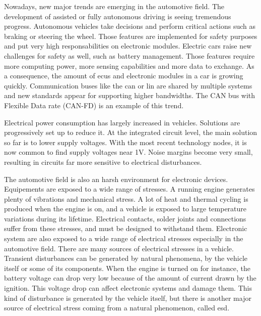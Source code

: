 Nowadays, new major trends are emerging in the automotive field.
The development of assisted or fully autonomous driving is seeing tremendous progress.
Autonomous vehicles take decisions and perform critical actions such as braking or steering the wheel.
Those features are implemented for safety purposes and put very high responsabilities on electronic modules.
Electric cars raise new challenges for safety as well, such as battery management.
Those features require more computing power, more sensing capabilities and more data to exchange.
As a consequence, the amount of \gls{ecu}s and electronic modules in a car is growing quickly.
Communication buses like the \gls{can} \cite{CAN} or \gls{lin} \cite{LIN} are shared by multiple systems and new standards appear for supporting higher bandwidths.
The CAN bus with Flexible Data rate (CAN-FD) is an example of this trend.

Electrical power consumption has largely increased in vehicles.
Solutions are progressively set up to reduce it.
At the integrated circuit level, the main solution so far is to lower supply voltages.
With the most recent technology nodes, it is now common to find supply voltages near 1V.
Noise margins become very small, resulting in circuits far more sensitive to electrical disturbances.

The automotive field is also an harsh environment for electronic devices.
Equipements are exposed to a wide range of stresses.
A running engine generates plenty of vibrations and mechanical stress.
A lot of heat and thermal cycling is produced when the engine is on, and a vehicle is exposed to large temperature variations during its lifetime.
Electrical contacts, solder joints and connections suffer from these stresses, and must be designed to withstand them.
Electronic system are also exposed to a wide range of electrical stresses especially in the automotive field.
There are many sources of electrical stresses in a vehicle.
Transient disturbances can be generated by natural phenomena, by the vehicle itself or some of its components.
When the engine is turned on for instance, the battery voltage can drop very low because of the amount of current drawn by the ignition.
This voltage drop can affect electronic systems and damage them.
This kind of disturbance is generated by the vehicle itself, but there is another major source of electrical stress coming from a natural phenomenon, called \gls{esd}.

